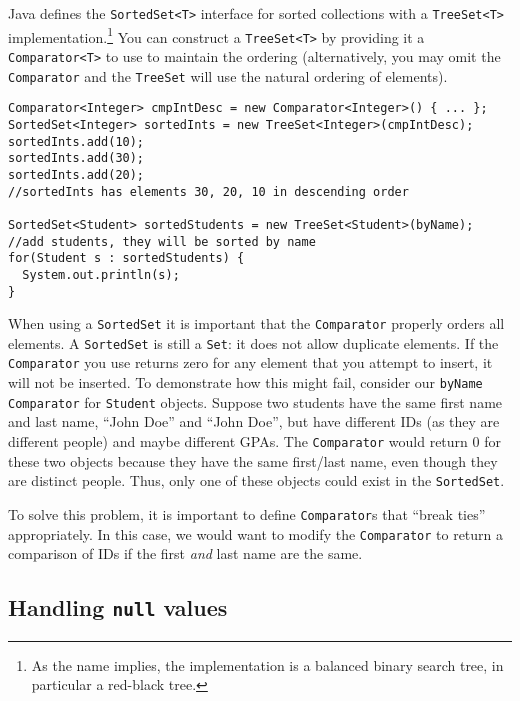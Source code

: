 Java defines the \texttt{SortedSet<T>} interface for sorted 
collections with a \texttt{TreeSet<T>} implementation.\footnote{As 
the name implies, the implementation is a balanced binary
search tree, in particular a red-black tree.}  You can construct a
\texttt{TreeSet<T>} by providing it a \texttt{Comparator<T>}
to use to maintain the ordering (alternatively, you may omit the
\texttt{Comparator} and the \texttt{TreeSet} will
use the natural ordering of elements).

\begin{verbatim}
Comparator<Integer> cmpIntDesc = new Comparator<Integer>() { ... };
SortedSet<Integer> sortedInts = new TreeSet<Integer>(cmpIntDesc);
sortedInts.add(10);
sortedInts.add(30);
sortedInts.add(20);
//sortedInts has elements 30, 20, 10 in descending order

SortedSet<Student> sortedStudents = new TreeSet<Student>(byName);
//add students, they will be sorted by name
for(Student s : sortedStudents) {
  System.out.println(s);
}
\end{verbatim}

When using a \texttt{SortedSet} it is important that the 
\texttt{Comparator} properly orders all elements.  A 
\texttt{SortedSet} is still a \texttt{Set}: it
does not allow duplicate elements.  If the \texttt{Comparator} 
you use returns zero for any element that you attempt to insert, it
will not be inserted.  To demonstrate how this might fail, consider
our \texttt{byName} \texttt{Comparator} for 
\texttt{Student} objects.  Suppose two students have
the same first name and last name, ``John Doe'' and ``John Doe'', but
have different IDs (as they are different people) and maybe different
GPAs.  The \texttt{Comparator} would return 0 for these
two objects because they have the same first/last name, even though
they are distinct people.  Thus, only one of these objects could 
exist in the \texttt{SortedSet}.

To solve this problem, it is important to define \texttt{Comparator}s
that ``break ties'' appropriately.  In this case, we would want to 
modify the \texttt{Comparator} to return a comparison
of IDs if the first \emph{and} last name are the same.  

\subsection{Handling \texttt{null} values}
\label{subsection:sortingObjectsWithNulls}

